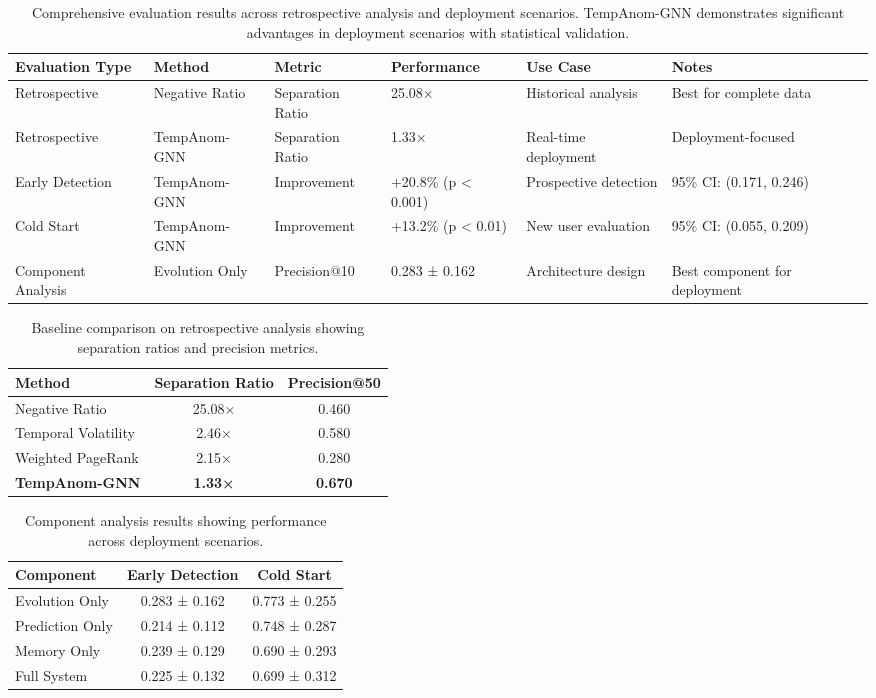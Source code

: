 \begin{table*}[htbp]
\centering
\caption{Comprehensive evaluation results across retrospective analysis and deployment scenarios. TempAnom-GNN demonstrates significant advantages in deployment scenarios with statistical validation.}
\label{tab:main_results}
\begin{tabular}{llllll}
\toprule
\textbf{Evaluation Type} & \textbf{Method} & \textbf{Metric} & \textbf{Performance} & \textbf{Use Case} & \textbf{Notes} \\
\midrule
Retrospective & Negative Ratio & Separation Ratio & 25.08× & Historical analysis & Best for complete data \\
Retrospective & TempAnom-GNN & Separation Ratio & 1.33× & Real-time deployment & Deployment-focused \\
\midrule
Early Detection & TempAnom-GNN & Improvement & +20.8\% (p < 0.001) & Prospective detection & 95\% CI: (0.171, 0.246) \\
Cold Start & TempAnom-GNN & Improvement & +13.2\% (p < 0.01) & New user evaluation & 95\% CI: (0.055, 0.209) \\
\midrule
Component Analysis & Evolution Only & Precision@10 & 0.283 ± 0.162 & Architecture design & Best component for deployment \\
\bottomrule
\end{tabular}
\end{table*}

\begin{table}[htbp]
\centering
\caption{Baseline comparison on retrospective analysis showing separation ratios and precision metrics.}
\label{tab:baseline}
\begin{tabular}{lcc}
\toprule
\textbf{Method} & \textbf{Separation Ratio} & \textbf{Precision@50} \\
\midrule
Negative Ratio & 25.08× & 0.460 \\
Temporal Volatility & 2.46× & 0.580 \\
Weighted PageRank & 2.15× & 0.280 \\
\textbf{TempAnom-GNN} & \textbf{1.33×} & \textbf{0.670} \\
\bottomrule
\end{tabular}
\end{table}

\begin{table}[htbp]
\centering
\caption{Component analysis results showing performance across deployment scenarios.}
\label{tab:components}
\begin{tabular}{lcc}
\toprule
\textbf{Component} & \textbf{Early Detection} & \textbf{Cold Start} \\
\midrule
Evolution Only & 0.283 ± 0.162 & 0.773 ± 0.255 \\
Prediction Only & 0.214 ± 0.112 & 0.748 ± 0.287 \\
Memory Only & 0.239 ± 0.129 & 0.690 ± 0.293 \\
Full System & 0.225 ± 0.132 & 0.699 ± 0.312 \\
\bottomrule
\end{tabular}
\end{table}